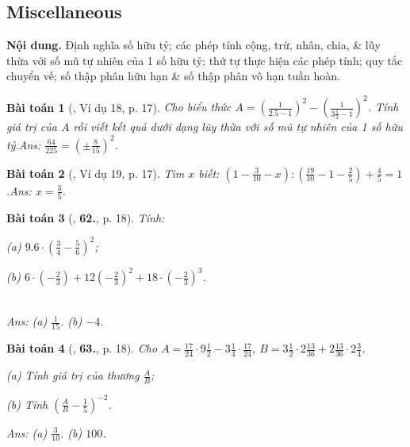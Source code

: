 \documentclass{article}
\numberwithin{equation}{section}
\newtheorem{baitoan}{Bài toán}
\begin{document}

\subsection{Miscellaneous}
\textsf{\textbf{Nội dung.} Định nghĩa số hữu tỷ; các phép tính cộng, trừ, nhân, chia, \& lũy thừa với số mũ tự nhiên của 1 số hữu tỷ; thứ tự thực hiện các phép tính; quy tắc chuyển vế; số thập phân hữu hạn \& số thập phân vô hạn tuần hoàn.}

\begin{baitoan}[\cite{Tuyen_Toan_7}, Ví dụ 18, p. 17]
	Cho biểu thức $A = \left(\frac{1}{2.5  -1}\right)^2 - \left(\frac{1}{3\frac{1}{2} - 1}\right)^2$. Tính giá trị của $A$ rồi viết kết quả dưới dạng lũy thừa với số mũ tự nhiên của 1 số hữu tỷ.\hfill\textsf{Ans:} $\frac{64}{225} = \left(\pm\frac{8}{15}\right)^2$.
\end{baitoan}


\begin{baitoan}[\cite{Tuyen_Toan_7}, Ví dụ 19, p. 17]
	Tìm $x$ biết: $\left(1 - \frac{3}{10} - x\right):\left(\frac{19}{10} - 1 - \frac{2}{5}\right) + \frac{4}{5} = 1$.\hfill\textsf{Ans:} $x = \frac{3}{5}$.
\end{baitoan}

\begin{baitoan}[\cite{Tuyen_Toan_7}, \textbf{62.}, p. 18]
	Tính:
	\begin{enumerate*}
		\item[(a)] $9.6\cdot\left(\frac{3}{4} - \frac{5}{6}\right)^2$;
		\item[(b)] $6\cdot\left(-\frac{2}{3}\right) + 12\left(-\frac{2}{3}\right)^2 + 18\cdot\left(-\frac{2}{3}\right)^3$.
	\end{enumerate*}\\\mbox{}\hfill\textsf{Ans:} (a) $\frac{1}{15}$. (b) $-4$.
\end{baitoan}

\begin{baitoan}[\cite{Tuyen_Toan_7}, \textbf{63.}, p. 18]
	Cho $A = \frac{17}{24}\cdot 9\frac{1}{2} - 3\frac{1}{4}\cdot\frac{17}{24}$, $B = 3\frac{1}{2}\cdot 2\frac{13}{36} + 2\frac{13}{36}\cdot 2\frac{3}{4}$.
	\begin{enumerate*}
		\item[(a)] Tính giá trị của thương $\frac{A}{B}$;
		\item[(b)] Tính $\left(\frac{A}{B} - \frac{1}{5}\right)^{-2}$.
	\end{enumerate*}\hfill\textsf{Ans:} (a) $\frac{3}{10}$. (b) $100$.
\end{baitoan}
\end{document}
